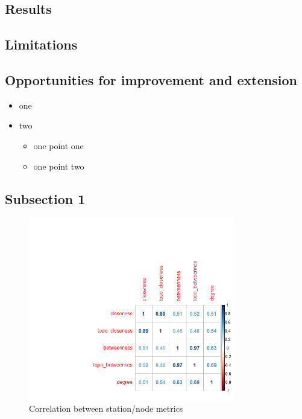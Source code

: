 \documentclass[11pt]{article} %
\begin{document}

\subsection{Results}

\subsection{Limitations}

\subsection{Opportunities for improvement and extension}








\begin{itemize}
\item one
\item two
  \begin{itemize}
  \item one point one
  \item one point two
  \end{itemize}
\end{itemize}

\subsection{Subsection 1}

\begin{figure}
\centering
\includegraphics[width=0.8\textwidth]{example}
\caption{Correlation between station/node metrics}
\end{figure}
\end{document}
